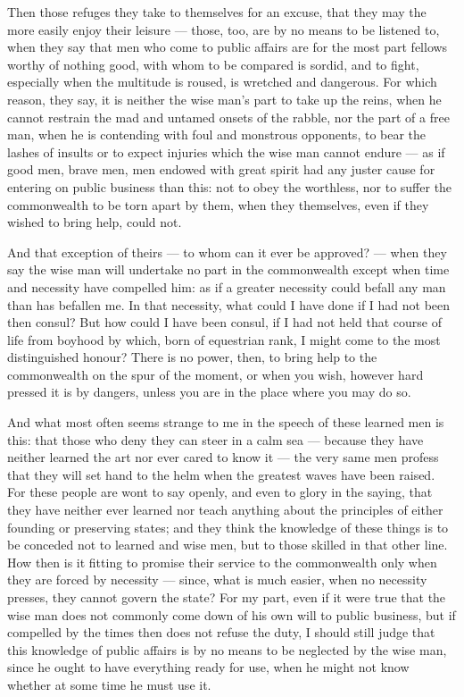  Then those refuges they take to themselves for an excuse, that they may the more easily enjoy their leisure --- those, too, are by no means to be listened to, when they say that men who come to public affairs are for the most part fellows worthy of nothing good, with whom to be compared is sordid, and to fight, especially when the multitude is roused, is wretched and dangerous. For which reason, they say, it is neither the wise man's part to take up the reins, when he cannot restrain the mad and untamed onsets of the rabble, nor the part of a free man, when he is contending with foul and monstrous opponents, to bear the lashes of insults or to expect injuries which the wise man cannot endure --- as if good men, brave men, men endowed with great spirit had any juster cause for entering on public business than this: not to obey the worthless, nor to suffer the commonwealth to be torn apart by them, when they themselves, even if they wished to bring help, could not.

 And that exception of theirs --- to whom can it ever be approved? --- when they say the wise man will undertake no part in the commonwealth except when time and necessity have compelled him: as if a greater necessity could befall any man than has befallen me. In that necessity, what could I have done if I had not been then consul? But how could I have been consul, if I had not held that course of life from boyhood by which, born of equestrian rank, I might come to the most distinguished honour? There is no power, then, to bring help to the commonwealth on the spur of the moment, or when you wish, however hard pressed it is by dangers, unless you are in the place where you may do so.

 And what most often seems strange to me in the speech of these learned men is this: that those who deny they can steer in a calm sea --- because they have neither learned the art nor ever cared to know it --- the very same men profess that they will set hand to the helm when the greatest waves have been raised. For these people are wont to say openly, and even to glory in the saying, that they have neither ever learned nor teach anything about the principles of either founding or preserving states; and they think the knowledge of these things is to be conceded not to learned and wise men, but to those skilled in that other line. How then is it fitting to promise their service to the commonwealth only when they are forced by necessity --- since, what is much easier, when no necessity presses, they cannot govern the state? For my part, even if it were true that the wise man does not commonly come down of his own will to public business, but if compelled by the times then does not refuse the duty, I should still judge that this knowledge of public affairs is by no means to be neglected by the wise man, since he ought to have everything ready for use, when he might not know whether at some time he must use it.

